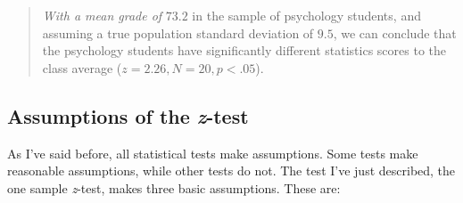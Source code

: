 \documentclass[
  a4paper,
]{book}
\begin{document}
\begin{quote}
\emph{With a mean grade of} \(73.2\) in the sample of psychology
students, and assuming a true population standard deviation of \(9.5\),
we can conclude that the psychology students have significantly
different statistics scores to the class average
(\(z = 2.26, N = 20, p<.05\)).
\end{quote}

\hypertarget{assumptions-of-the-z-test}{%
\subsection{\texorpdfstring{Assumptions of the
\emph{z}-test}{Assumptions of the z-test}}\label{assumptions-of-the-z-test}}

As I've said before, all statistical tests make assumptions. Some tests
make reasonable assumptions, while other tests do not. The test I've
just described, the one sample \emph{z}-test, makes three basic
assumptions. These are:
\end{document}
